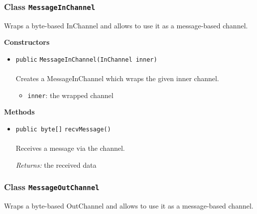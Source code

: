 \subsubsection{Class \lstinline|MessageInChannel|}
Wraps a byte-based InChannel and allows to use it as a message-based
 channel. \\
\noindent\begin{minipage}[t]{5cm}
\vspace{0.3em}
\hspace*{2em}
\vspace{0.3em}
\end{minipage}




\textbf{\sffamily Constructors}
\begin{itemize}
\item \lstinline|public| \lstinline|MessageInChannel|\lstinline|(InChannel inner)|\\ \\[-0.6em]
Creates a MessageInChannel which wraps the given inner channel.
\begin{itemize}
\item \lstinline|inner|: the wrapped channel
\end{itemize}



\end{itemize}


\textbf{\sffamily Methods}
\begin{itemize}
\item \lstinline|public byte[]| \lstinline|recvMessage|\lstinline|()|\\ \\[-0.6em]
Receives a message via the channel.

\emph{Returns:} the received data

\end{itemize}

\subsubsection{Class \lstinline|MessageOutChannel|}
Wraps a byte-based OutChannel and allows to use it as a message-based
 channel. \\
\noindent\begin{minipage}[t]{5cm}
\vspace{0.3em}
\hspace*{2em}
\vspace{0.3em}
\end{minipage}




